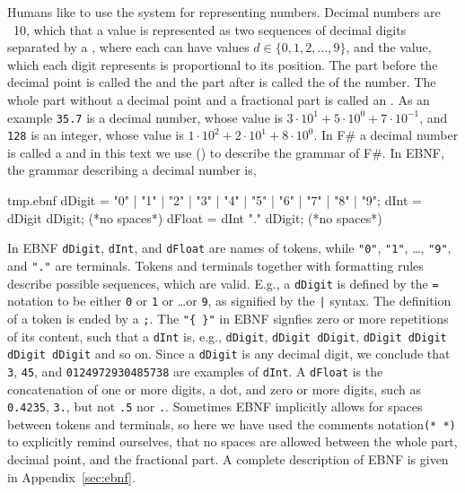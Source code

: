 Humans like to use the  system for representing numbers. Decimal numbers are ~10, which that a value is represented as two sequences of decimal digits separated by a , where each  can have values $d \in \{0,1,2,\ldots,9\}$, and the value, which each digit represents is proportional to its position. The part before the decimal point is called the  and the part after is called the  of the number. The whole part without a decimal point and a fractional part is called an . As an example \lstinline!35.7! is a decimal number, whose value is $3\cdot 10^1+5\cdot 10^0+7\cdot 10^{-1}$, and \lstinline!128! is an integer, whose value is $1\cdot 10^2+2\cdot 10^1+8\cdot 10^{0}$. In F\# a decimal number is called a  and in this text we use  () to describe the grammar of F\#. In EBNF, the grammar describing a decimal number is,
%
\begin{verbatimwrite}{tmp.ebnf}
dDigit = "0" | "1" | "2" | "3" | "4" | "5" | "6" | "7" | "8" | "9";
dInt = dDigit {dDigit}; (*no spaces*)
dFloat = dInt "." {dDigit}; (*no spaces*)
\end{verbatimwrite}
%
In EBNF \lstinline[language=ebnf]!dDigit!, \lstinline[language=ebnf]!dInt!, and \lstinline[language=ebnf]!dFloat! are names of tokens, while \lstinline[language=ebnf]!"0"!, \lstinline[language=ebnf]!"1"!, \ldots, \lstinline[language=ebnf]!"9"!, and \lstinline[language=ebnf]!"."! are terminals. Tokens and terminals together with formatting  rules describe possible sequences, which are valid. E.g., a \lstinline[language=ebnf]!dDigit! is defined by the \lstinline[language=ebnf]!=! notation to be either \lstinline!0! or \lstinline!1!  or \dots or \lstinline!9!, as signified by the \lstinline[language=ebnf]!|! syntax. The definition of a token is ended by a \lstinline[language=ebnf]!;!. The \lstinline[language=ebnf]!"{ }"! in EBNF signfies zero or more repetitions of its content, such that a \lstinline[language=ebnf]!dInt! is, e.g., \lstinline[language=ebnf]!dDigit!, \lstinline[language=ebnf]!dDigit dDigit!, \lstinline[language=ebnf]!dDigit dDigit dDigit dDigit! and so on. Since a \lstinline[language=ebnf]!dDigit! is any decimal digit, we conclude that \lstinline!3!, \lstinline!45!, and \lstinline!0124972930485738! are examples of \lstinline[language=ebnf]!dInt!.   A \lstinline[language=ebnf]!dFloat! is the concatenation of one or more digits, a dot, and zero or more digits, such as \lstinline!0.4235!, \lstinline!3.!, but not \lstinline!.5! nor \lstinline!.!. Sometimes EBNF implicitly allows for spaces between tokens and terminals, so here we have used the comments notation\lstinline[language=ebnf]!(* *)! to explicitly remind ourselves, that no spaces are allowed between the whole part, decimal point, and the fractional part. A complete description of EBNF is given in Appendix~\ref{sec:ebnf}.

